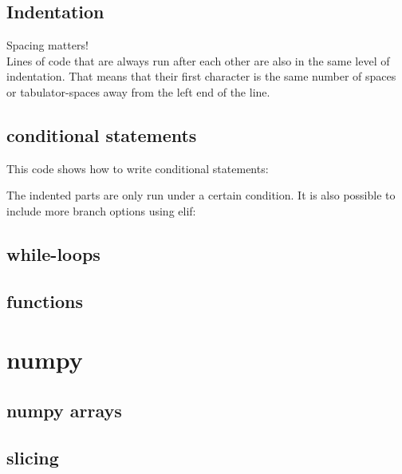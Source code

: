 \documentclass[10pt,a4paper]{article}
\begin{document}
\subsection{Indentation}
Spacing matters!\\
Lines of code that are always run after each other are also in the same level of indentation. That means that their first character is the same number of spaces or tabulator-spaces away from the left end of the line.
\subsection{conditional statements}
 
 
\lstset{style=mystyle}

This code shows how to write conditional statements:

The indented parts are only run under a certain condition.
It is also possible to include more branch options using elif:

\subsection{while-loops}
\subsection{functions}
\section{numpy}
\subsection{numpy arrays}
\subsection{slicing}






\end{document}
